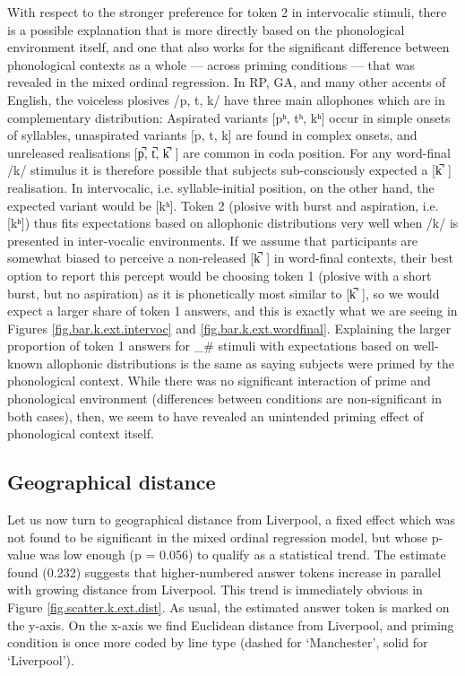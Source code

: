 With respect to the stronger preference for token 2 in intervocalic stimuli, there is a possible explanation that is more directly based on the phonological environment itself, and one that also works for the significant difference between phonological contexts as a whole --- across priming conditions --- that was revealed in the mixed ordinal regression.
In RP, GA, and many other accents of English, the voiceless plosives /p, t, k/ have three main allophones which are in complementary distribution: Aspirated variants [pʰ, tʰ, kʰ] occur in simple onsets of syllables, unaspirated variants [p, t, k] are found in complex onsets, and unreleased realisations [p̚, t̚, k̚~] are common in coda position.
For any word-final /k/ stimulus it is therefore possible that subjects sub-consciously expected a [k̚~] realisation.
In intervocalic, i.e. syllable-initial position, on the other hand, the expected variant would be [kʰ].
Token 2 (plosive with burst and aspiration, i.e. [kʰ]) thus fits expectations based on allophonic distributions very well when /k/ is presented in inter-vocalic environments.
If we assume that participants are somewhat biased to perceive a non-released [k̚~] in word-final contexts, their best option to report this percept would be choosing token 1 (plosive with a short burst, but no aspiration) as it is phonetically most similar to [k̚~], so we would expect a larger share of token 1 answers, and this is exactly what we are seeing in Figures \ref{fig.bar.k.ext.intervoc} and \ref{fig.bar.k.ext.wordfinal}.
Explaining the larger proportion of token 1 answers for \_\# stimuli with expectations based on well-known allophonic distributions is the same as saying subjects were primed by the phonological context.
While there was no significant interaction of prime and phonological environment (differences between conditions are non-significant in both cases), then, we seem to have revealed an unintended priming effect of phonological context itself.

\subsection{Geographical distance}
\label{sec.perc_res.k.geography}

Let us now turn to geographical distance from Liverpool, a fixed effect which was not found to be significant in the mixed ordinal regression model, but whose p-value was low enough (p = 0.056) to qualify as a statistical trend.
The estimate found (0.232) suggests that higher-numbered answer tokens increase in parallel with growing distance from Liverpool.
This trend is immediately obvious in Figure \ref{fig.scatter.k.ext.dist}.
As usual, the estimated answer token is marked on the y-axis.
On the x-axis we find Euclidean distance from Liverpool, and priming condition is once more coded by line type (dashed for `Manchester', solid for `Liverpool').

